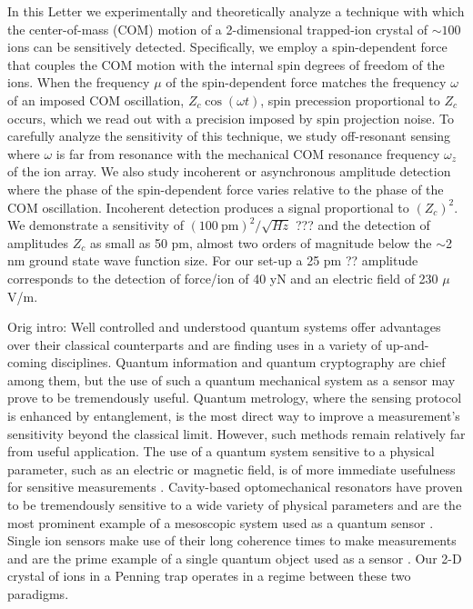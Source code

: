 \documentclass[aps,prl,twocolumn,superscriptaddress,floatfix]{revtex4-1}
\begin{document}
In this Letter we experimentally and theoretically analyze a technique
with which the center-of-mass (COM) motion of a 2-dimensional trapped-ion
crystal of $\sim100$ ions can be sensitively detected. Specifically,
we employ a spin-dependent force that couples the COM motion with
the internal spin degrees of freedom of the ions. When the frequency
$\mu$ of the spin-dependent force matches the frequency $\omega$
of an imposed COM oscillation, $Z_{c}\cos\left(\omega t\right)$,
spin precession proportional to $Z_{c}$ occurs, which we read out
with a precision imposed by spin projection noise. To carefully analyze
the sensitivity of this technique, we study off-resonant sensing where
$\omega$ is far from resonance with the mechanical COM resonance
frequency $\omega_{z}$ of the ion array. We also study incoherent
or asynchronous amplitude detection where the phase of the spin-dependent
force varies relative to the phase of the COM oscillation. Incoherent
detection produces a signal proportional to $\left(Z_{c}\right)^{2}$.
We demonstrate a sensitivity of $(100\:\mathrm{pm})^{2}/\sqrt{Hz}$
??? and the detection of amplitudes $Z_{c}$ as small as 50 pm,
almost two orders of magnitude below the $\sim$2 nm ground state
wave function size. For our set-up a 25 pm ?? amplitude corresponds
to the detection of force/ion of 40 yN and an electric field of 230
$\mu$V/m. 

Orig intro:
Well controlled and understood quantum systems offer advantages over their classical counterparts and are finding uses in a variety of up-and-coming disciplines. Quantum information and quantum cryptography are chief among them, but the use of such a quantum mechanical system as a sensor may prove to be tremendously useful. Quantum metrology, where the sensing protocol is enhanced by entanglement, is the most direct way to improve a measurement's sensitivity beyond the classical limit. However, such methods remain relatively far from useful application. The use of a quantum system sensitive to a physical parameter, such as an electric or magnetic field, is of more immediate usefulness for sensitive measurements \citep{Degen2016}. Cavity-based optomechanical resonators have proven to be tremendously sensitive to a wide variety of physical parameters and are the most prominent example of a mesoscopic system used as a quantum sensor \citep{Clark2016,Kampel2016,Kim2016a,Schreppler2014a}. Single ion sensors make use of their long coherence times to make measurements and are the prime example of a single quantum object used as a sensor \citep{Shaniv2016,Ivanov2016a,Knunz2010}. Our 2-D crystal of ions in a Penning trap operates in a regime between these two paradigms.
 
\end{document}
